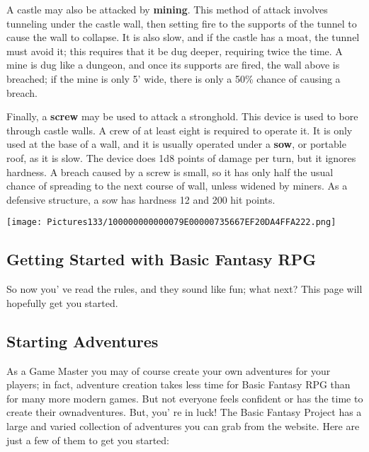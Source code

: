 \documentclass[a4paper,twoside,openany,10pt]{book}
\begin{document}
\begin{multicols}{2}
A castle may also be attacked by \textbf{mining}. This method of attack involves tunneling under the castle wall, then setting fire to the supports of the tunnel to cause the wall to collapse. It is also slow, and if the castle has a moat, the tunnel must avoid it; this requires that it be dug deeper, requiring twice the time. A mine is dug like a dungeon, and once its supports are fired, the wall above is breached; if the mine is only 5' wide, there is only a 50\% chance of causing a breach.

Finally, a \textbf{screw} may be used to attack a stronghold. This device is used to bore through castle walls. A crew of at least eight is required to operate it. It is only used at the base of a wall, and it is usually operated under a \textbf{sow}, or portable roof, as it is slow. The device does 1d8 points of damage per turn, but it ignores hardness. A breach caused by a screw is small, so it has only half the usual chance of spreading to the next course of wall, unless widened by miners. As a defensive structure, a sow has hardness 12 and 200 hit points. 
\end{multicols}

\pagebreak

\begin{center}
	\texttt{[image: Pictures133/100000000000079E00000735667EF20DA4FFA222.png]} 
\end{center}

\pagebreak

\subsection{Getting Started with Basic Fantasy RPG}\label{getting-started-with-basic-fantasy-rpg}

So now you' ve read the rules, and they sound like fun;
what next? This page will hopefully get you started.

\subsection{Starting Adventures}\label{starting-adventures}

As a Game Master you may of course create your own adventures for your players; in fact, adventure creation takes less time for Basic Fantasy RPG than for many more modern games. But not everyone feels confident or has the time to create their ownadventures. But, you' re  in luck! The Basic Fantasy Project has a large and varied collection of adventures you can grab from the website. Here are just a few of them to get you started:
\end{document}
